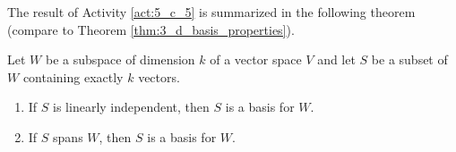The result of Activity \ref{act:5_c_5} is summarized in the following theorem (compare to Theorem \ref{thm:3_d_basis_properties}).



\begin{theorem} Let $W$ be a subspace of dimension $k$ of a vector space $V$ and let $S$ be a subset of $W$ containing exactly $k$ vectors.
\begin{enumerate}
\item If $S$ is linearly independent, then $S$ is a basis for $W$.
\item If $S$ spans $W$, then $S$ is a basis for $W$.
\end{enumerate}
\end{theorem}

\label{sec:dims_exam}

\ExampleIntro

